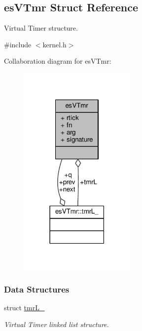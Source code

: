 \hypertarget{structesVTmr}{\subsection{es\-V\-Tmr Struct Reference}
\label{structesVTmr}
}


Virtual Timer structure.  




{\ttfamily \#include $<$kernel.\-h$>$}



Collaboration diagram for es\-V\-Tmr\-:\nopagebreak
\begin{figure}[H]
\begin{center}
\leavevmode
\includegraphics[width=162pt]{structesVTmr__coll__graph}
\end{center}
\end{figure}
\subsubsection*{Data Structures}
\begin{DoxyCompactItemize}
\item 
struct \hyperlink{structesVTmr_1_1tmrL__}{tmr\-L\-\_\-}
\begin{DoxyCompactList}\small\item\em Virtual Timer linked list structure. \end{DoxyCompactList}\end{DoxyCompactItemize}
